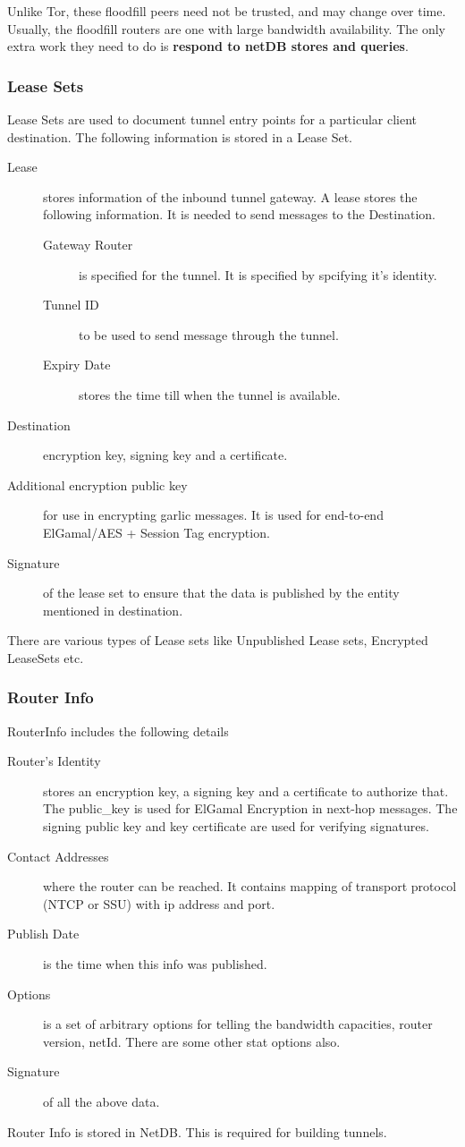 \documentclass{main}
\begin{document}
Unlike Tor, these floodfill peers need not be trusted, and may change over time. Usually, the floodfill
routers are one with large bandwidth availability. The only extra work they need to do is \textbf{respond to
netDB stores and queries}.

\subsubsection{Lease Sets}
\label{subsubsec:leaseSet}
Lease Sets are used to document tunnel entry points for a particular client destination. The following information is
stored in a Lease Set.
\begin{description}
	\item [Lease] stores information of the inbound tunnel gateway. A lease
		stores the following information. It is needed to send messages to the Destination.
		\begin{description}
			\item [Gateway Router] is specified for the tunnel. It is specified by spcifying it's identity.
			\item [Tunnel ID] to be used to send message through the tunnel.
			\item [Expiry Date] stores the time till when the tunnel is available.
		\end{description}
	\item [Destination] encryption key, signing key and a certificate.
	\item [Additional encryption public key] for use in encrypting garlic messages. It is used for end-to-end 
		ElGamal/AES + Session Tag encryption.
	\item [Signature] of the lease set to ensure that the data is published by the entity mentioned
		in destination.
\end{description}
There are various types of Lease sets like Unpublished Lease sets, Encrypted LeaseSets etc.

\subsubsection{Router Info}
\label{subsubsec:routerInfo}
RouterInfo includes the following details
\begin{description}
	\item [Router's Identity] stores an encryption key, a signing key and a certificate to authorize that.
		The public\_key is used for ElGamal Encryption in next-hop messages. The signing public key and
		key certificate are used for verifying signatures.
	\item [Contact Addresses] where the router can be reached. It contains mapping of transport protocol (NTCP or SSU)
		with ip address and port. 
	\item [Publish Date] is the time when this info was published.
	\item [Options] is a set of arbitrary options for telling the bandwidth capacities, router version, netId. There
		are some other stat options also.
	\item [Signature] of all the above data.
\end{description}
Router Info is stored in NetDB. This is required for building tunnels.
\end{document}
